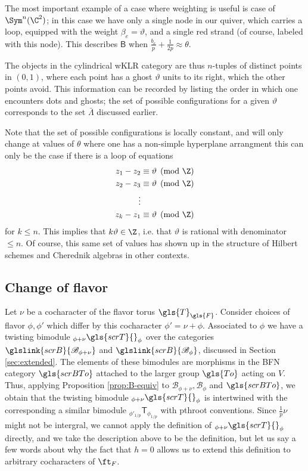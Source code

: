 \begin{example}
The most important example of a case where weighting is useful is case
of $\Sym^n(\C^2)$; in this case we have only a single node in our
quiver, which carries a loop, equipped with the weight
$\beta_e=\vartheta$, and a single red strand (of course, labeled with
this node). This describes $\mathsf{B}$ when
$\frac{b_e}{p}+\frac{1}{2p}\approx \theta$.  

The objects in the cylindrical wKLR category are thus $n$-tuples of distinct points in $(0,1)$, where each point has a ghost $\vartheta$ units to its right, which the other points avoid.  This information can be recorded by listing the order in which one encounters dots and ghosts; the set of possible configurations for a given $\vartheta$ corresponds to the set $\bar \Lambda$ discussed earlier.  

Note that the set of possible configurations is locally constant, and
will only change at values of $\theta$ where one has a non-simple
hyperplane arrangment this can only be the case if there is a loop of equations 
\begin{align*}
    z_1-z_2&\equiv\vartheta\pmod \Z\\
    z_2-z_3&\equiv\vartheta\pmod \Z\\
    \vdots&\\
    z_k-z_1&\equiv\vartheta\pmod \Z
\end{align*}
for $k\leq n$.  This implies that $k\vartheta\in \Z$, i.e. that $\vartheta$ is rational with denominator $\leq n$.  Of course, this same set of values has shown up in the structure of Hilbert schemes and Cherednik algebras in other contexts. 
\end{example}
 

\subsection{Change of flavor}
\label{sec:change-flavor}

Let $\nu$ be a cocharacter of the flavor torus $\gls{T}_{\gls{F}}$.
Consider choices of flavor $\phi,\phi'$ which differ by this
cocharacter $\phi'=\nu+\phi$.  Associated to $\phi$ we have a twisting bimodule  ${}_{\phi+\nu}\gls{scrT}{}_{\phi}$  over the categories
$\glslink{scrB}{\mathscr{B}_{\phi+\nu}}$ and $\glslink{scrB}{\mathscr{B}_{\phi}}$, discussed in Section \ref{sec:extended}. The elements of these bimodules are morphisms in the
BFN category $\gls{scrBTo}$ attached to the larger group
$\gls{To}$ acting on $V$.
Thus, applying  Proposition \ref{prop:B-equiv} to 
$\mathscr{B}_{\phi+\nu}, \mathscr{B}_{\phi}$ and $\gls{scrBTo}$,
we obtain that the twisting bimodule
${}_{\phi+\nu}\gls{scrT}{}_{\phi}$  is intertwined with the
corresponding a similar bimodule  ${}_{\phi'_{1/p}}\mathsf{T}_{\phi_{1/p}}$
with \gls{pthroot} conventions.  Since $\frac{1}{p}\nu$ might not be
intergral, we cannot apply the definition of
${}_{\phi+\nu}\gls{scrT}{}_{\phi}$ directly, and we take the
description above to be the definition, but let us say a few words
about why the fact that $h=0$
allows us to extend this definition to arbitrary cocharacters of $\ft_{F}$.

